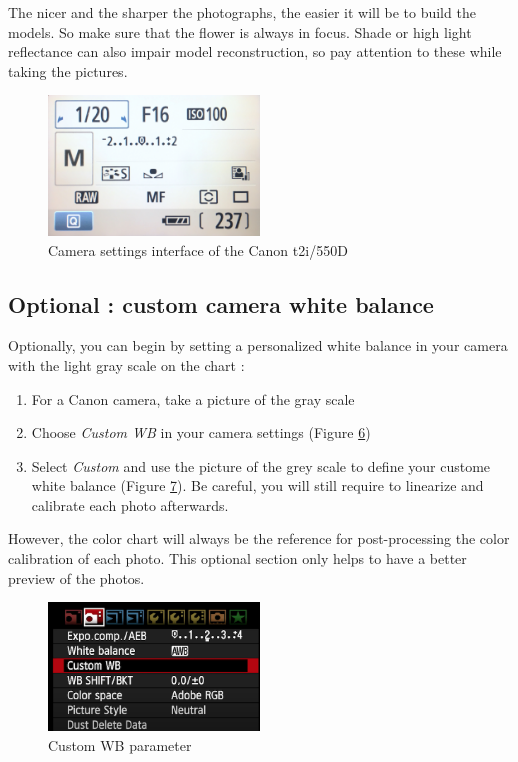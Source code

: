 \documentclass[
]{book}
\begin{document}
The nicer and the sharper the photographs, the easier it will be to
build the models. So make sure that the flower is always in focus. Shade
or high light reflectance can also impair model reconstruction, so pay
attention to these while taking the pictures.

\begin{figure}
\hypertarget{fig:my_label}{%
\centering
\includegraphics[width=0.5\textwidth,height=\textheight]{Figures/camera_settings.JPG}
\caption{Camera settings interface of the Canon
t2i/550D}\label{fig:my_label}
}
\end{figure}

\hypertarget{optional-custom-camera-white-balance}{%
\subsection{Optional : custom camera white balance}\label{optional-custom-camera-white-balance}}

Optionally, you can begin by setting a personalized white balance in
your camera with the light gray scale on the chart :

\begin{enumerate}
\def\labelenumi{\arabic{enumi}.}
\item
  For a Canon camera, take a picture of the gray scale
\item
  Choose \emph{Custom WB} in your camera settings (Figure
  \protect\hyperlink{WB_sub1}{6})
\item
  Select \emph{Custom} and use the picture of the grey scale to define your
  custome white balance (Figure \protect\hyperlink{WB_sub2}{7}). Be careful, you will still require to
  linearize and calibrate each photo afterwards.
\end{enumerate}

However, the color chart will always be the reference for
post-processing the color calibration of each photo. This optional
section only helps to have a better preview of the photos.

\begin{figure}
\hypertarget{WB_sub1}{%
\centering
\includegraphics[width=0.5\textwidth,height=\textheight]{Figures/Custom WB setting.png}
\caption{Custom WB parameter}\label{WB_sub1}
}
\end{figure}
\end{document}

